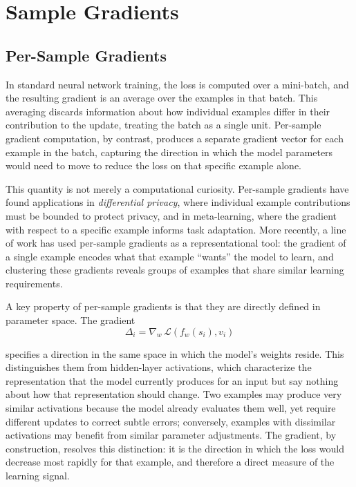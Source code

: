 \section{Sample Gradients}


\subsection{Per-Sample Gradients}

In standard neural network training, the loss is computed over a mini-batch, and the resulting gradient is an average over the examples in that batch. This averaging discards information about how individual examples differ in their contribution to the update, treating the batch as a single unit. Per-sample gradient computation, by contrast, produces a separate gradient vector for each example in the batch, capturing the direction in which the model parameters would need to move to reduce the loss on that specific example alone.

This quantity is not merely a computational curiosity. Per-sample gradients have found applications in \emph{differential privacy}, where individual example contributions must be bounded to protect privacy, and in meta-learning, where the gradient with respect to a specific example informs task adaptation. More recently, a line of work has used per-sample gradients as a representational tool: the gradient of a single example encodes what that example ``wants'' the model to learn, and clustering these gradients reveals groups of examples that share similar learning requirements.




A key property of per-sample gradients is that they are directly defined in parameter space. The gradient
\[\Delta_i​=\nabla_w ​\, \mathcal{L}(f_w​(s_i​),v_i​)\]

specifies a direction in the same space in which the model's weights reside. This distinguishes them from hidden-layer activations, which characterize the representation that the model currently produces for an input but say nothing about how that representation should change. Two examples may produce very similar activations because the model already evaluates them well, yet require different updates to correct subtle errors; conversely, examples with dissimilar activations may benefit from similar parameter adjustments. The gradient, by construction, resolves this distinction: it is the direction in which the loss would decrease most rapidly for that example, and therefore a direct measure of the learning signal.


